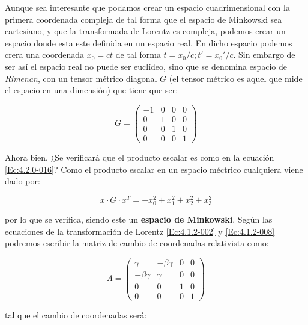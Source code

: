 \documentclass[12pt,a4paper]{book}
\begin{document}

Aunque sea interesante que podamos crear un espacio cuadrimensional con la primera coordenada compleja de tal forma que el espacio de Minkowski sea cartesiano, y que la transformada de Lorentz es compleja, podemos crear un espacio donde esta este definida en un espacio real. En dicho espacio podemos crera una coordenada $x_0 = ct$ de tal forma $t = x_0/c; t' = x_0'/c$. Sin embargo de ser así el espacio real no puede ser euclídeo, sino que se denomina espacio de \textit{Rimenan}, con un tensor métrico diagonal $G$ (el tensor métrico es aquel que mide el espacio en una dimensión) que tiene que ser:


\begin{equation}
G = \begin{pmatrix}
-1 &
0 & 
0 & 
0 \\
0 & 
1 &
0 & 
0 \\ 
0 &
0 & 
1 &
0 \\ 
0 & 
0 & 
0 & 
1 
\end{pmatrix}
\end{equation}

Ahora bien, ¿Se verificará que el producto escalar es como en la ecuación \ref{Ec:4.2.0-016}? Como el producto escalar en un espacio méctrico cualquiera viene dado por:

\begin{equation}
x \cdot G \cdot x^T = - x_0^2 + x_1^2 + x_2^2 + x_3^2
\end{equation}

por lo que se verifica, siendo este un \textbf{espacio de Minkowski}. Según las ecuaciones de la transformación de Lorentz \ref{Ec:4.1.2-002} y \ref{Ec:4.1.2-008} podremos escribir la matriz de cambio de coordenadas relativista como:



\begin{equation}
\Lambda = 
\begin{pmatrix}
\gamma &
- \beta \gamma &
0 & 0 \\ 
- \beta \gamma &
\gamma &
0 & 0\\ 
0  &
0  &
1 & 0 \\
0 & 0 & 0 & 1
\end{pmatrix}
\end{equation}

tal que el cambio de coordenadas será:
\end{document}
